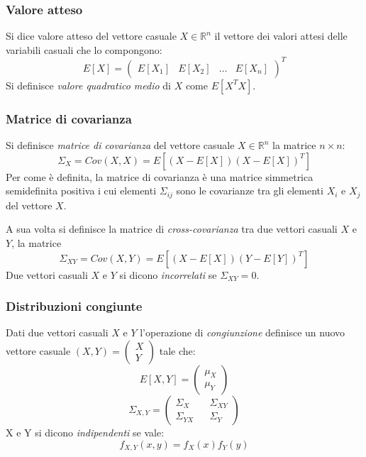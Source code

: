 \subsubsection{Valore atteso}
Si dice valore atteso del vettore casuale $X \in \mathbb{R}^n$ il vettore dei valori attesi delle variabili casuali che lo compongono: 
\begin{equation}
E[X] = \begin{pmatrix}
E[X_1] & E[X_2] & \dots & E[X_n]
\end{pmatrix}^T
\end{equation}
Si definisce \textit{valore quadratico medio} di $X$ come $E[X^T X]$.

\subsubsection{Matrice di covarianza}
Si definisce \textit{matrice di covarianza} del vettore casuale $X \in \mathbb{R}^n$ la matrice $n \times n$: \begin{equation}
 \Sigma_X = Cov(X, X) = E[(X-E[X])(X-E[X])^T]
\end{equation}
Per come è definita, la matrice di covarianza è una matrice simmetrica semidefinita positiva i cui elementi $\Sigma_{ij}$ sono le covarianze tra gli elementi $X_i$ e $X_j$ del vettore $X$.

A sua volta si definisce la matrice di \textit{cross-covarianza} tra due vettori casuali $X$ e $Y$, la matrice
\begin{equation}
 \Sigma_{XY} = Cov(X, Y) = E[(X-E[X])(Y-E[Y])^T]
\end{equation}
Due vettori casuali $X$ e $Y$ si dicono \textit{incorrelati} se $\Sigma_{XY} = 0$.\\

\subsubsection{Distribuzioni congiunte}
Dati due vettori casuali $X$ e $Y$ l'operazione di \textit{congiunzione} definisce un nuovo vettore casuale $(X,Y)=\begin{pmatrix}X \\ Y\end{pmatrix}$ tale che: 
\begin{equation}
E[X,Y]=\begin{pmatrix}\mu_X \\ \mu_Y\end{pmatrix}
\end{equation}
\begin{equation}
	\Sigma_{X,Y}=\begin{pmatrix}\Sigma_X && \Sigma_{XY} \\ \Sigma_{YX} && \Sigma_Y\end{pmatrix}
\end{equation}
X e Y si dicono \textit{indipendenti} se vale:
\begin{equation}
	f_{X,Y}(x,y)=f_X(x)f_Y(y)
\end{equation}

